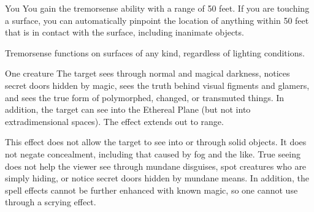 \begin{spellheader}
\end{spellheader}
\begin{spelleffects}
    \begin{spelltarget}{You}
        \spelleffect You gain the tremorsense ability with a range of 50 feet. If you are touching a surface, you can automatically pinpoint the location of anything within 50 feet that is in contact with the surface, including inanimate objects.
    \end{spelltarget}
\end{spelleffects}
\begin{spellfooter}
    \spellnotes Tremorsense functions on surfaces of any kind, regardless of lighting conditions.
\end{spellfooter}

\begin{spellheader}
    \spelldur{\durshort}
\end{spellheader}
\begin{spelleffects}
    \begin{spelltarget}{One creature}
        \spelleffect The target sees through normal and magical darkness, notices secret doors hidden by magic, sees the truth behind visual figments and glamers, and sees the true form of polymorphed, changed, or transmuted things. In addition, the target can see into the Ethereal Plane (but not into extradimensional spaces). The effect extends out to \rngmed range.
    \end{spelltarget}
\end{spelleffects}
\begin{spellfooter}
    \spellnotes This effect does not allow the target to see into or through solid objects. It does not negate concealment, including that caused by fog and the like. True seeing does not help the viewer see through mundane disguises, spot creatures who are simply hiding, or notice secret doors hidden by mundane means. In addition, the spell effects cannot be further enhanced with known magic, so one cannot use  through a scrying effect.
\end{spellfooter}

